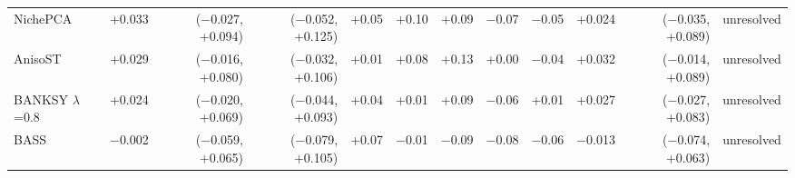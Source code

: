 \begin{tabular}{lrrrrrrrrrrl}
NichePCA & +0.033 & ($-$0.027, +0.094) & ($-$0.052, +0.125) & +0.05 & +0.10 & +0.09 & $-$0.07 & $-$0.05 & +0.024 & ($-$0.035, +0.089) & unresolved \\
AnisoST & +0.029 & ($-$0.016, +0.080) & ($-$0.032, +0.106) & +0.01 & +0.08 & +0.13 & +0.00 & $-$0.04 & +0.032 & ($-$0.014, +0.089) & unresolved \\
BANKSY $\lambda$=0.8 & +0.024 & ($-$0.020, +0.069) & ($-$0.044, +0.093) & +0.04 & +0.01 & +0.09 & $-$0.06 & +0.01 & +0.027 & ($-$0.027, +0.083) & unresolved \\
BASS & $-$0.002 & ($-$0.059, +0.065) & ($-$0.079, +0.105) & +0.07 & $-$0.01 & $-$0.09 & $-$0.08 & $-$0.06 & $-$0.013 & ($-$0.074, +0.063) & unresolved \\
\bottomrule
\end{tabular}

